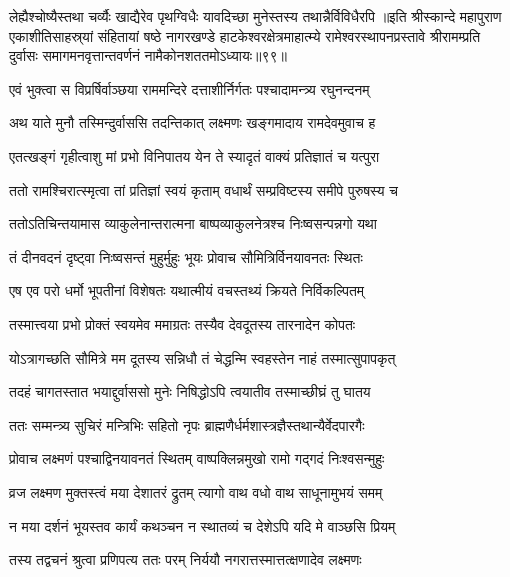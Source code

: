 \twolineshloka
{लेह्यैश्चोष्यैस्तथा चर्व्यैः खाद्यैरेव पृथग्विधैः}
{यावदिच्छा मुनेस्तस्य तथान्नैर्विविधैरपि}%
॥इति श्रीस्कान्दे महापुराण एकाशीतिसाहस्र्यां संहितायां षष्ठे नागरखण्डे हाटकेश्वरक्षेत्रमाहात्म्ये रामेश्वरस्थापनप्रस्तावे श्रीरामम्प्रति दुर्वासः समागमनवृत्तान्तवर्णनं नामैकोनशततमोऽध्यायः॥९९॥


\twolineshloka
{एवं भुक्त्वा स विप्रर्षिर्वाञ्छया राममन्दिरे}
{दत्ताशीर्निर्गतः पश्चादामन्त्र्य रघुनन्दनम्}%

\twolineshloka
{अथ याते मुनौ तस्मिन्दुर्वाससि तदन्तिकात्}
{लक्ष्मणः खङ्गमादाय रामदेवमुवाच ह}%

\twolineshloka
{एतत्खङ्गं गृहीत्वाशु मां प्रभो विनिपातय}
{येन ते स्यादृतं वाक्यं प्रतिज्ञातं च यत्पुरा}%

\twolineshloka
{ततो रामश्चिरात्स्मृत्वा तां प्रतिज्ञां स्वयं कृताम्}
{वधार्थं सम्प्रविष्टस्य समीपे पुरुषस्य च}%

\twolineshloka
{ततोऽतिचिन्तयामास व्याकुलेनान्तरात्मना}
{बाष्पव्याकुलनेत्रश्च निःष्वसन्पन्नगो यथा}%

\twolineshloka
{तं दीनवदनं दृष्ट्वा निःष्वसन्तं मुहुर्मुहुः}
{भूयः प्रोवाच सौमित्रिर्विनयावनतः स्थितः}%

\twolineshloka
{एष एव परो धर्मो भूपतीनां विशेषतः}
{यथात्मीयं वचस्तथ्यं क्रियते निर्विकल्पितम्}%

\twolineshloka
{तस्मात्त्वया प्रभो प्रोक्तं स्वयमेव ममाग्रतः}
{तस्यैव देवदूतस्य तारनादेन कोपतः}%

\twolineshloka
{योऽत्रागच्छति सौमित्रे मम दूतस्य सन्निधौ}
{तं चेद्धन्मि स्वहस्तेन नाहं तस्मात्सुपापकृत्}%

\twolineshloka
{तदहं चागतस्तात भयाद्दुर्वाससो मुनेः}
{निषिद्धोऽपि त्वयातीव तस्माच्छीघ्रं तु घातय}%

\twolineshloka
{ततः सम्मन्त्र्य सुचिरं मन्त्रिभिः सहितो नृपः}
{ब्राह्मणैर्धर्मशास्त्रज्ञैस्तथान्यैर्वेदपारगैः}%

\twolineshloka
{प्रोवाच लक्ष्मणं पश्चाद्विनयावनतं स्थितम्}
{वाष्पक्लिन्नमुखो रामो गद्गदं निःश्वसन्मुहुः}%

\twolineshloka
{व्रज लक्ष्मण मुक्तस्त्वं मया देशातरं द्रुतम्}
{त्यागो वाथ वधो वाथ साधूनामुभयं समम्}%

\twolineshloka
{न मया दर्शनं भूयस्तव कार्यं कथञ्चन}
{न स्थातव्यं च देशेऽपि यदि मे वाञ्छसि प्रियम्}%

\twolineshloka
{तस्य तद्वचनं श्रुत्वा प्रणिपत्य ततः परम्}
{निर्ययौ नगरात्तस्मात्तत्क्षणादेव लक्ष्मणः}%

